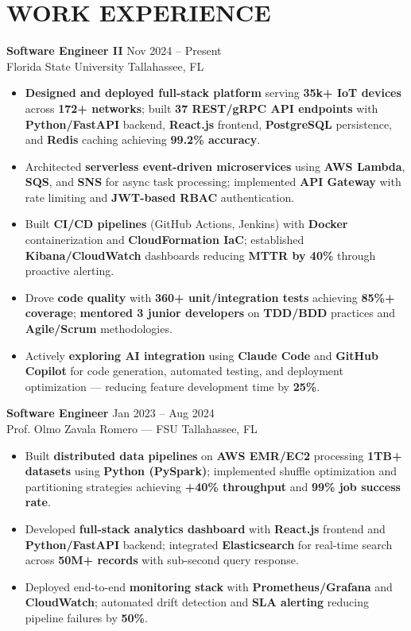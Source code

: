 \documentclass[letterpaper,10pt]{article}
\newcommand{\resumeItem}[1]{\item\small #1}
\newcommand{\resumeSubheading}[4]{
  \vspace{6pt}
  \noindent
  \textbf{#1} \hfill {\footnotesize #2} \\
  [-1pt]
  \noindent
  \small #3 \hfill {\small #4}
  \vspace{3pt}
}
\newcommand{\resumeItemsStart}{\vspace{-2pt}\begin{itemize}}
\newcommand{\resumeItemsEnd}{\end{itemize}\vspace{6pt}}
\begin{document}
\section{\textcolor{metablue}{WORK EXPERIENCE}}
\vspace{-12pt}

\resumeSubheading
{Software Engineer II}{Nov 2024 -- Present}
{Florida State University}{Tallahassee, FL}
\resumeItemsStart
\resumeItem{\textbf{Designed and deployed full-stack platform} serving \textbf{35k+ IoT devices} across \textbf{172+ networks}; built \textbf{37 REST/gRPC API endpoints} with \textbf{Python/FastAPI} backend, \textbf{React.js} frontend, \textbf{PostgreSQL} persistence, and \textbf{Redis} caching achieving \textbf{99.2\% accuracy}.}
\resumeItem{Architected \textbf{serverless event-driven microservices} using \textbf{AWS Lambda}, \textbf{SQS}, and \textbf{SNS} for async task processing; implemented \textbf{API Gateway} with rate limiting and \textbf{JWT-based RBAC} authentication.}
\resumeItem{Built \textbf{CI/CD pipelines} (GitHub Actions, Jenkins) with \textbf{Docker} containerization and \textbf{CloudFormation IaC}; established \textbf{Kibana/CloudWatch} dashboards reducing \textbf{MTTR by 40\%} through proactive alerting.}
\resumeItem{Drove \textbf{code quality} with \textbf{360+ unit/integration tests} achieving \textbf{85\%+ coverage}; \textbf{mentored 3 junior developers} on \textbf{TDD/BDD} practices and \textbf{Agile/Scrum} methodologies.}
\resumeItem{Actively \textbf{exploring AI integration} using \textbf{Claude Code} and \textbf{GitHub Copilot} for code generation, automated testing, and deployment optimization --- reducing feature development time by \textbf{25\%}.}
\resumeItemsEnd
\vspace{-12pt}

\resumeSubheading
{Software Engineer}{Jan 2023 -- Aug 2024}
{Prof. Olmo Zavala Romero — FSU}{Tallahassee, FL}
\resumeItemsStart
\resumeItem{Built \textbf{distributed data pipelines} on \textbf{AWS EMR/EC2} processing \textbf{1TB+ datasets} using \textbf{Python (PySpark)}; implemented shuffle optimization and partitioning strategies achieving \textbf{+40\% throughput} and \textbf{99\% job success rate}.}
\resumeItem{Developed \textbf{full-stack analytics dashboard} with \textbf{React.js} frontend and \textbf{Python/FastAPI} backend; integrated \textbf{Elasticsearch} for real-time search across \textbf{50M+ records} with sub-second query response.}
\resumeItem{Deployed end-to-end \textbf{monitoring stack} with \textbf{Prometheus/Grafana} and \textbf{CloudWatch}; automated drift detection and \textbf{SLA alerting} reducing pipeline failures by \textbf{50\%}.}
\resumeItemsEnd
\vspace{-12pt}
\end{document}

